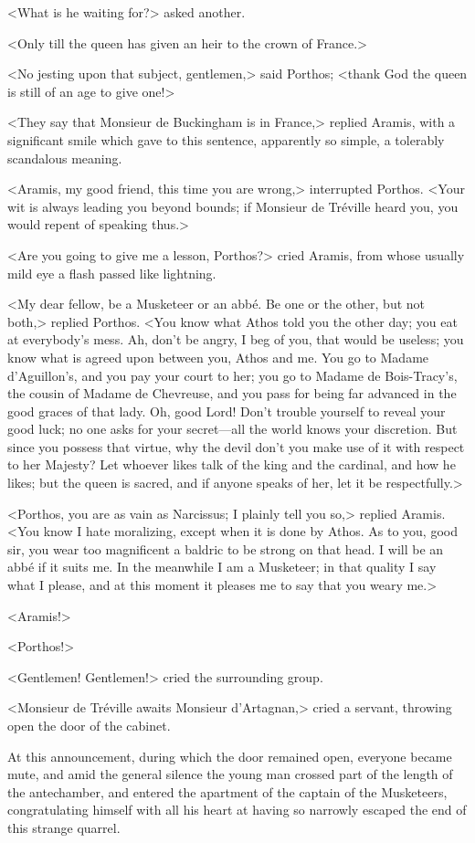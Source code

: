 <What is he waiting for?> asked another. 

<Only till the queen has given an heir to the crown of France.> 

<No jesting upon that subject, gentlemen,> said Porthos; <thank God the queen is still of an age to give one!> 

<They say that Monsieur de Buckingham is in France,> replied Aramis, with a significant smile which gave to this sentence, apparently so simple, a tolerably scandalous meaning. 

<Aramis, my good friend, this time you are wrong,> interrupted Porthos. <Your wit is always leading you beyond bounds; if Monsieur de Tréville heard you, you would repent of speaking thus.> 

<Are you going to give me a lesson, Porthos?> cried Aramis, from whose usually mild eye a flash passed like lightning. 

<My dear fellow, be a Musketeer or an abbé. Be one or the other, but not both,> replied Porthos. <You know what Athos told you the other day; you eat at everybody's mess. Ah, don't be angry, I beg of you, that would be useless; you know what is agreed upon between you, Athos and me. You go to Madame d'Aguillon's, and you pay your court to her; you go to Madame de Bois-Tracy's, the cousin of Madame de Chevreuse, and you pass for being far advanced in the good graces of that lady. Oh, good Lord! Don't trouble yourself to reveal your good luck; no one asks for your secret---all the world knows your discretion. But since you possess that virtue, why the devil don't you make use of it with respect to her Majesty? Let whoever likes talk of the king and the cardinal, and how he likes; but the queen is sacred, and if anyone speaks of her, let it be respectfully.> 

<Porthos, you are as vain as Narcissus; I plainly tell you so,> replied Aramis. <You know I hate moralizing, except when it is done by Athos. As to you, good sir, you wear too magnificent a baldric to be strong on that head. I will be an abbé if it suits me. In the meanwhile I am a Musketeer; in that quality I say what I please, and at this moment it pleases me to say that you weary me.> 

<Aramis!> 

<Porthos!> 

<Gentlemen! Gentlemen!> cried the surrounding group. 

<Monsieur de Tréville awaits Monsieur d'Artagnan,> cried a servant, throwing open the door of the cabinet. 

At this announcement, during which the door remained open, everyone became mute, and amid the general silence the young man crossed part of the length of the antechamber, and entered the apartment of the captain of the Musketeers, congratulating himself with all his heart at having so narrowly escaped the end of this strange quarrel.

